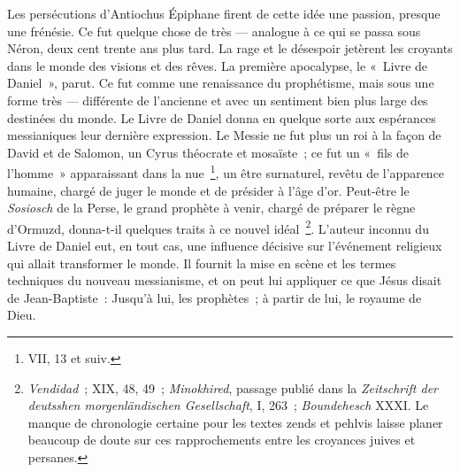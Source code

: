 \documentclass[french,twoside]{book} %
\begin{document}
Les persécutions d’Antiochus Épiphane firent de cette idée une passion, presque une frénésie. Ce fut quelque chose de très — analogue à ce qui se passa sous Néron, deux cent trente ans plus tard. La rage et le désespoir jetèrent les croyants dans le monde des visions et des rêves. La première apocalypse, le « Livre de Daniel », parut. Ce fut comme une renaissance du prophétisme, mais sous une forme très — différente de l’ancienne et avec un sentiment bien plus large des destinées du monde. Le Livre de Daniel donna en quelque sorte aux espérances messianiques leur dernière expression. Le Messie ne fut plus un roi à la façon de David et de Salomon, un Cyrus théocrate et mosaïste ; ce fut un « fils de l’homme » apparaissant dans la nue \footnote{VII, 13 et suiv.}, un être surnaturel, revêtu de l’apparence humaine, chargé de juger le monde et de présider à l’âge d’or. Peut-être le {\itshape Sosiosch} de la Perse, le grand prophète à venir, chargé de préparer le règne d’Ormuzd, donna-t-il quelques traits à ce nouvel idéal \footnote{{\itshape Vendidad} ; XIX, 48, 49 ; {\itshape Minokhired}, passage publié dans la {\itshape Zeitschrift der deutsshen morgenländischen Gesellschaft}, I, 263 ; {\itshape Boundehesch} XXXI. Le manque de chronologie certaine pour les textes zends et pehlvis laisse planer beaucoup de doute sur ces rapprochements entre les croyances juives et persanes.}. L’auteur inconnu du Livre de Daniel eut, en tout cas, une influence décisive sur l’événement religieux qui allait transformer le monde. Il fournit la mise en scène et les termes techniques du nouveau messianisme, et on peut lui appliquer ce que Jésus disait de Jean-Baptiste : Jusqu’à lui, les prophètes ; à partir de lui, le royaume de Dieu.\par
\end{document}
